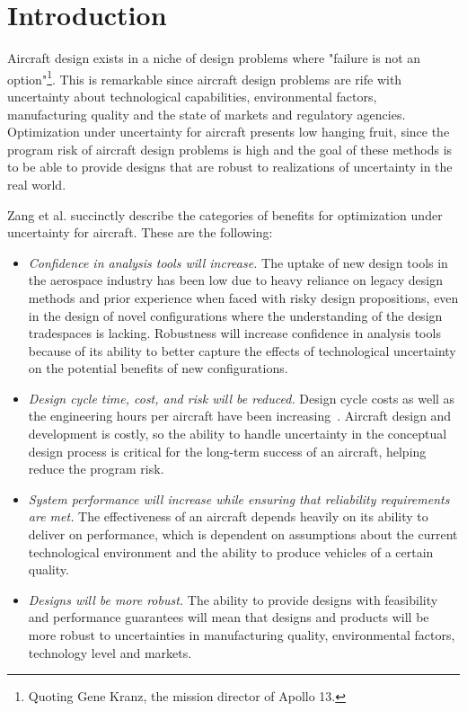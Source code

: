 \section{Introduction}

Aircraft design exists in a niche of design problems where "failure is
not an option"\footnote{Quoting Gene Kranz, the mission director of Apollo 13.}.
This is remarkable since aircraft design problems are rife with uncertainty about
technological capabilities, environmental factors, manufacturing quality and the
state of markets and regulatory agencies. Optimization under uncertainty for aircraft presents
low hanging fruit, since the program risk of aircraft design
problems is high and the goal of these methods is to be able to provide designs that are robust
to realizations of uncertainty in the real world.

Zang et al.\cite{Zang2002} succinctly describe the categories of benefits for optimization under uncertainty for aircraft.
These are the following:
\begin{itemize}
    \item \emph{Confidence in analysis tools will increase.}
    The uptake of new design tools in the aerospace industry has been low
    due to heavy reliance on legacy design methods and prior experience when
    faced with risky design propositions,
    even in the design of novel configurations where the understanding
    of the design tradespaces is lacking. Robustness will increase
    confidence in analysis tools because of its ability to better capture the
    effects of technological uncertainty on the potential benefits of new
    configurations.
    \item \emph{Design cycle time, cost, and risk will be reduced.}
    Design cycle costs as well as the engineering hours per aircraft have been increasing~\cite{Patt2012}.
    Aircraft design and development is costly, so the ability to handle uncertainty in
    the conceptual design process is critical for the long-term success of an aircraft,
    helping reduce the program risk.
    \item \emph{System performance will increase while ensuring that reliability requirements
    are met.}
    The effectiveness of an aircraft depends heavily on its
    ability to deliver on performance, which is dependent on assumptions about the
    current technological environment and the ability to produce vehicles of a certain quality.
    \item \emph{Designs will be more robust.}
    The ability to provide designs with feasibility and performance guarantees will mean
    that designs and products will be more robust to uncertainties in manufacturing quality,
    environmental factors, technology level and markets.
\end{itemize}

